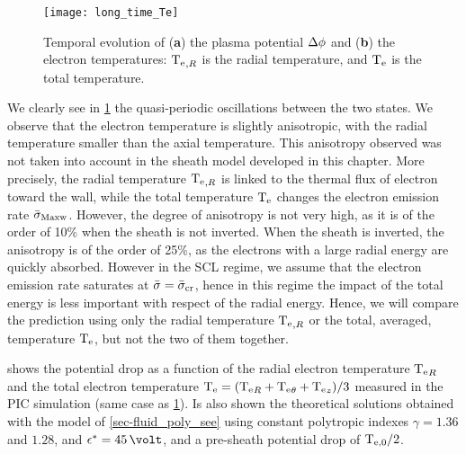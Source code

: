      \renewcommand\subfigurewidth{0.7\textwidth}
    \begin{figure}[!hbt]
      \centering
      \texttt{[image: long\_time\_Te]}
      \caption{Temporal evolution of ({\bf a}) the plasma potential $\Delta \phi$ and ({\bf b}) the electron temperatures\string: $\mathrm{T_e}_{,R}$ is the radial temperature, and $\mathrm{T_e}$ is the total temperature.}
      \label{fig-long_time}
    \end{figure}
    \renewcommand\subfigurewidth{0.47\textwidth}
    
    We clearly see in \cref{fig-long_time} the quasi-periodic oscillations between the two states.
    We observe that the electron temperature is slightly anisotropic, with the radial temperature smaller than the axial temperature.
    This anisotropy observed was not taken into account in the sheath model developed in this chapter.
    More precisely, the radial temperature $\mathrm{T_e}_{,R}$ is linked to the thermal flux of electron toward the wall, while the total temperature $\mathrm{T_e}$ changes the electron emission rate $ \bar{\sigma }_{\rm Maxw}$.
    However, the degree of anisotropy is not very high, as it is of the order of 10\% when the sheath is not inverted.
    When the sheath is inverted, the anisotropy is of the order of 25\%, as the electrons with a large radial energy are quickly absorbed.
    However in the \ac{SCL} regime, we assume that the electron emission rate saturates at $ \bar{\sigma }= \bar{\sigma }_{\rm cr}$, hence in this regime the impact of the total energy is less important with respect of the radial energy.
    Hence, we will compare the prediction using only the radial temperature $\mathrm{T_e}_{,R}$ or the total, averaged, temperature $\mathrm{T_e}$, but not the two of them together.
    
     shows the potential drop as a function of the radial electron temperature $\mathrm{T_e}_R$ and the total electron temperature $\mathrm{T_e} = (\mathrm{T_e}_R + \mathrm{T_e}_{\theta} + \mathrm{T_e}_z)/3$ measured in the \ac{PIC} simulation (same case as \cref{fig-long_time}).
    Is also shown the theoretical solutions obtained with the model of \cref{sec-fluid_poly_see} using constant polytropic indexes $\gamma=1.36$ and $1.28$, and $\crover=45\,\volt$, and a pre-sheath potential drop of $\mathrm{T_{e, 0}}/2$.
    
